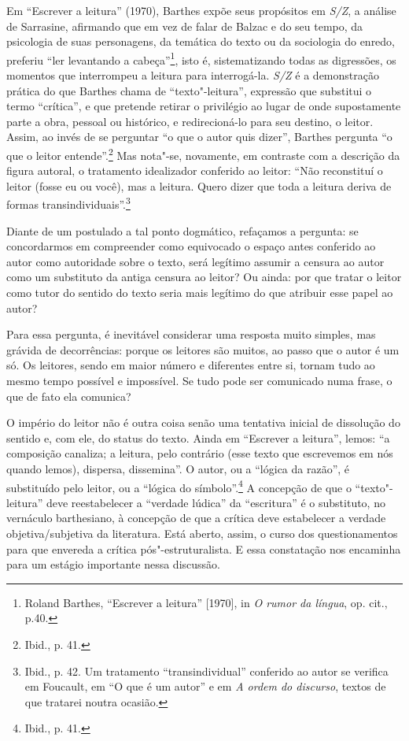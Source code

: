 Em ``Escrever a leitura'' (1970), Barthes expõe seus propósitos em \emph{S/Z},
a análise de Sarrasine, afirmando que em vez de falar de Balzac e do seu
tempo, da psicologia de suas personagens, da temática do texto ou da
sociologia do enredo, preferiu ``ler levantando a cabeça''\footnote{Roland
  Barthes, ``Escrever a leitura'' [1970], in \emph{O rumor da
  língua}, op. cit., p.40.}, isto é, sistematizando todas as digressões,
os momentos que interrompeu a leitura para interrogá-la. \emph{S/Z} é a
demonstração prática do que Barthes chama de ``texto"-leitura'',
expressão que substitui o termo ``crítica'', e que pretende retirar o
privilégio ao lugar de onde supostamente parte a obra, pessoal ou
histórico, e redirecioná-lo para seu destino, o leitor. Assim, ao invés
de se perguntar ``o que o autor quis dizer'', Barthes pergunta ``o que o
leitor entende''.\footnote{Ibid., p. 41.} Mas nota"-se, novamente, em
contraste com a descrição da figura autoral, o tratamento idealizador
conferido ao leitor: ``Não reconstituí o leitor (fosse eu ou você), mas
a leitura. Quero dizer que toda a leitura deriva de formas
transindividuais''.\footnote{Ibid., p. 42. Um tratamento
  ``transindividual'' conferido ao autor se verifica em Foucault, em ``O
  que é um autor'' e em \emph{A ordem do discurso}, textos de que
  tratarei noutra ocasião.}

Diante de um postulado a tal ponto dogmático, refaçamos a pergunta: se
concordarmos em compreender como equivocado o espaço antes conferido ao
autor como autoridade sobre o texto, será legítimo assumir a censura ao
autor como um substituto da antiga censura ao leitor? Ou ainda: por que
tratar o leitor como tutor do sentido do texto seria mais legítimo do
que atribuir esse papel ao autor?

Para essa pergunta, é inevitável considerar uma resposta muito simples,
mas grávida de decorrências: porque os leitores são muitos, ao passo que
o autor é um só. Os leitores, sendo em maior número e diferentes entre
si, tornam tudo ao mesmo tempo possível e impossível. Se tudo pode ser
comunicado numa frase, o que de fato ela comunica?

O império do leitor não é outra coisa senão uma tentativa inicial de
dissolução do sentido e, com ele, do status do texto. Ainda em
``Escrever a leitura'', lemos: ``a composição canaliza; a leitura, pelo
contrário (esse texto que escrevemos em nós quando lemos), dispersa,
dissemina''. O autor, ou a ``lógica da razão'', é substituído pelo
leitor, ou a ``lógica do símbolo''.\footnote{Ibid., p. 41.} A concepção
de que o ``texto"-leitura'' deve reestabelecer a ``verdade lúdica'' da
``escritura'' é o substituto, no vernáculo barthesiano, à concepção de
que a crítica deve estabelecer a verdade objetiva/subjetiva da
literatura. Está aberto, assim, o curso dos questionamentos para que
envereda a crítica pós"-estruturalista. E essa constatação nos encaminha
para um estágio importante nessa discussão.

